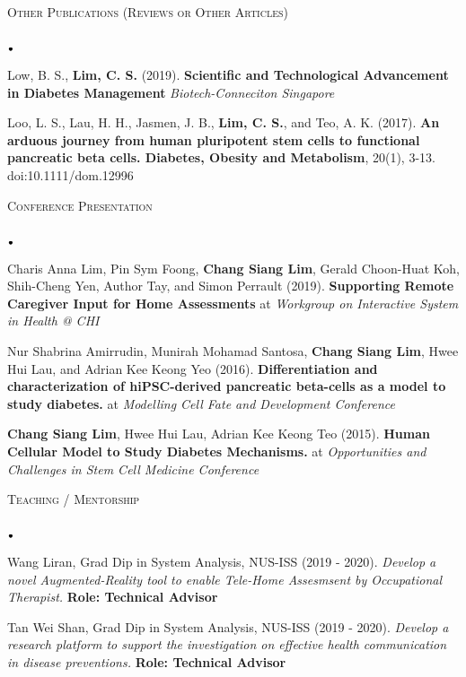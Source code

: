 \documentclass[11pt]{article}
\newcommand{\lineunder}{\vspace*{-8pt} \\ \hspace*{-18pt} \hrulefill \\}
\newcommand{\header}[1]{{\hspace*{-15pt}\vspace*{6pt} \textsc{#1}} \vspace*{-6pt} \lineunder}
\newcommand{\lbt}{\,\begin{picture}(-1,1)(-1,-3)\circle*{3}\end{picture}\ }
\newenvironment{achievements}{
    \begin{list}{$\lbt$}{
        \topsep 0pt
        \itemsep 0pt
        \addtolength{\leftmargin}{-0.1in}
    }
}
{
    \vspace*{4pt}
    \end{list}
}
\begin{document}
\header{Other Publications (Reviews or Other Articles)}
\vspace*{2mm}
\begin{achievements}
\justifying
\item Low, B. S., \textbf{Lim, C. S.} (2019). \textbf{Scientific and Technological Advancement in Diabetes Management} \textit{Biotech-Conneciton Singapore}
\item {Loo, L. S., Lau, H. H., Jasmen, J. B., \textbf{Lim, C. S.}, and Teo, A. K. (2017). \textbf{An arduous journey from human pluripotent stem cells to functional pancreatic beta cells. Diabetes, Obesity and Metabolism}, 20(1), 3-13. doi:10.1111/dom.12996}
\end{achievements}
\hfill{}

\header{Conference Presentation}
\vspace*{2mm}
\begin{achievements}
\justifying
\item Charis Anna Lim, Pin Sym Foong, \textbf{Chang Siang Lim}, Gerald Choon-Huat Koh, Shih-Cheng Yen, Author Tay, and Simon Perrault
(2019). \textbf{Supporting Remote Caregiver Input for Home Assessments} at \textit{Workgroup on Interactive System in Health @ CHI}
\item Nur Shabrina Amirrudin, Munirah Mohamad Santosa, \textbf{Chang Siang Lim}, 
Hwee Hui Lau, and Adrian Kee Keong Yeo (2016). \textbf{Differentiation and characterization of hiPSC-derived pancreatic beta-cells as a model 
to study diabetes.} at \textit{Modelling Cell Fate and Development Conference}
\item \textbf{Chang Siang Lim}, Hwee Hui Lau, Adrian Kee Keong Teo (2015). 
\textbf{Human Cellular Model to Study Diabetes Mechanisms.} at 
\textit{Opportunities and Challenges in Stem Cell Medicine Conference}
\end{achievements}
\hfill{}

\header{Teaching / Mentorship}
\vspace{2mm}
\begin{achievements}
\justifying
\item Wang Liran, Grad Dip in System Analysis, NUS-ISS (2019 - 2020). 
\textit{Develop a novel Augmented-Reality tool to enable Tele-Home Assesmsent by Occupational Therapist.}
\textbf{Role: Technical Advisor}
\item Tan Wei Shan, Grad Dip in System Analysis, NUS-ISS (2019 - 2020).
\textit{Develop a research platform to support the investigation on effective health communication in disease preventions.}
\textbf{Role: Technical Advisor}
\end{achievements}
\hfill{}
\end{document}
